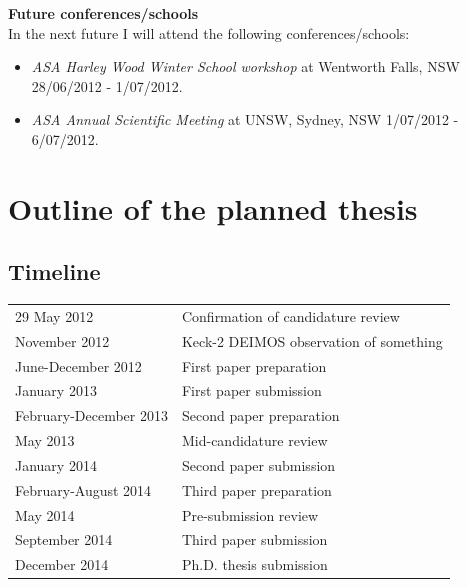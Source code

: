 \documentclass[useAMS,usenatbib,onecolumn]{mnras}
\begin{document}
  \textbf{Future conferences/schools\\}
  In the next future I will attend the following conferences/schools:
  \begin{itemize}
    \item{\textit{ASA Harley Wood Winter School workshop}} at Wentworth Falls, NSW 28/06/2012 - 1/07/2012.
    \item{\textit{ASA Annual Scientific Meeting}} at UNSW, Sydney, NSW 1/07/2012 - 6/07/2012.
  \end{itemize}




\section{Outline of the planned thesis}
\label{sec:thesisOutline}

\subsection*{Timeline}

\begin{tabular*}{0.75\textwidth}{ l l }
  29 May 2012                 & Confirmation of candidature review \\
  November 2012               & Keck-2 DEIMOS observation of something \\
  June-December 2012            & First paper preparation \\
  January 2013                & First paper submission\\
  February-December 2013          & Second paper preparation \\
  May 2013                  & Mid-candidature review \\
  January 2014                & Second paper submission \\
  February-August 2014              & Third paper preparation \\
  May 2014                  & Pre-submission review \\
  September 2014              & Third paper submission \\
  December 2014               & Ph.D. thesis submission \\
\end{tabular*}


\begin{multicols}{2}
	
	{\footnotesize
	\setlength{\itemsep}{1pt}
	\begin{spacing}{0.5}
		{}
	\end{spacing}	}
\end{multicols}
\end{document}
